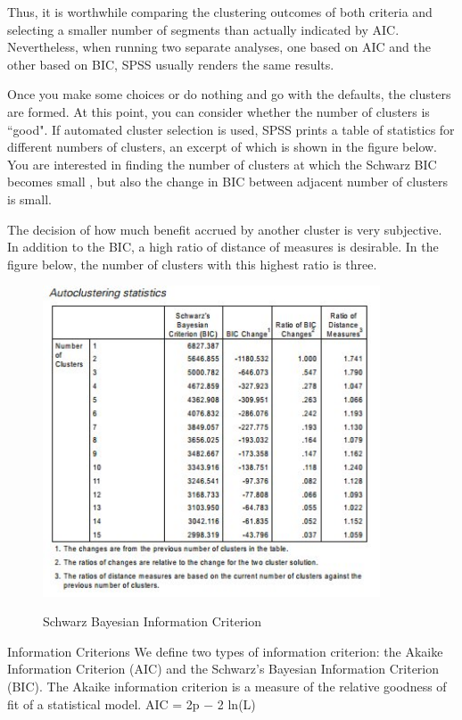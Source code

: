 \documentclass[a4paper,12pt]{article}
\begin{document}
Thus, it is worthwhile comparing the clustering
outcomes of both criteria and selecting a smaller number of segments than
actually indicated by AIC. Nevertheless, when running two separate analyses,
one based on AIC and the other based on BIC, SPSS usually renders the same
results.

Once you make some choices or do nothing and go with the defaults, the clusters are
formed. At this point, you can consider whether the number of clusters is ``good". If
automated cluster selection is used, SPSS prints a table of statistics for different
numbers of clusters, an excerpt of which is shown in the figure below. You are interested
in finding the number of clusters at which the Schwarz BIC becomes small , but also the change in BIC between
adjacent number of clusters is small. 

The decision of how much benefit accrued by another cluster is very subjective. In addition to the BIC, a high ratio of distance of measures is desirable. In the figure below, the number of clusters with this highest ratio is three.

\begin{figure}[h!]
\begin{centering}
  \includegraphics[width=10cm]{TwoStep1.jpg}\\
  \caption{Schwarz Bayesian Information Criterion}
\end{centering}
\end{figure}


Information Criterions
We define two types of information criterion: the Akaike Information Criterion (AIC) and the
Schwarz’s Bayesian Information Criterion (BIC). The Akaike information criterion is a measure
of the relative goodness of fit of a statistical model.
AIC = 2p − 2 ln(L)
\end{document}
